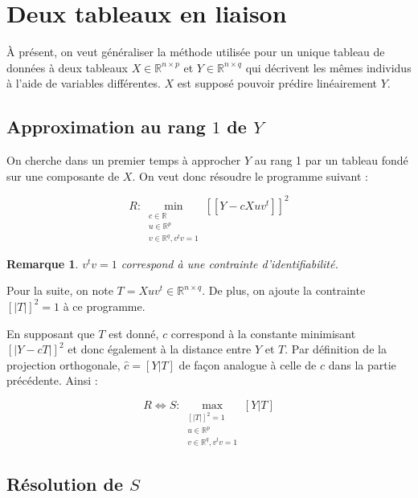 \documentclass[12pt, openany, fleqn, french]{article}
\newtheorem*{remark}{Remarque}
\begin{document}
\newpage

\section{Deux tableaux en liaison}

À présent, on veut généraliser la méthode utilisée pour un unique tableau de données à deux tableaux $X \in \mathbb{R}^{n\times p}$ et $Y \in \mathbb{R}^{n\times q}$ qui décrivent les mêmes individus à l'aide de variables différentes. $X$ est supposé pouvoir prédire linéairement $Y$. \\

\subsection{Approximation au rang $1$ de $Y$}

On cherche dans un premier temps à approcher $Y$ au rang 1 par un tableau fondé sur une composante de $X$. On veut donc résoudre le programme suivant :

$$R : \displaystyle \min_{\substack{c \in \mathbb{R} \\ u \in \mathbb{R}^{p} \\ v \in \mathbb{R}^{q} , v^tv=1}}[\![Y-cXuv^t]\!]^{2}$$

\begin{remark}
    $v^tv=1$ correspond à une contrainte d'identifiabilité.
\end{remark}

Pour la suite, on note $ T = Xuv^t \in \mathbb{R}^{n\times q}$. De plus, on ajoute la contrainte $[|T|]^2 = 1$ à ce programme.

En supposant que $T$ est donné, $c$ correspond à la constante minimisant $[|Y - cT|]^2$ et donc également à la distance entre $Y$ et $T$. Par définition de la projection orthogonale, $\hat{c} = [Y|T]$ de façon analogue à celle de $\hat{c}$ dans la partie précédente.
Ainsi : 

$$R \Leftrightarrow S : \displaystyle \max_{\substack{[|T|]^2 = 1 \\ u \in \mathbb{R}^{p} \\ v \in \mathbb{R}^{q} , v^tv=1}}[Y|T] $$


\subsection{Résolution de $S$}
\end{document}
